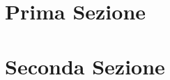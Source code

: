 \documentclass[twoside]{article}
\begin{document}
\begin{multicols}{2} %

\section{Prima Sezione}

\lipsum[2]

%
%

\section{Seconda Sezione}

\lipsum[3]

\end{multicols}
\end{document}
